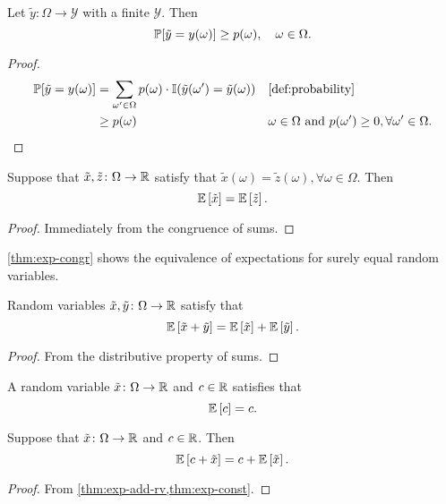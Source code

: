 \begin{lemma} \label{lem:prob-ge-measure}
  Let $\tilde{y}\colon \Omega \to \mathcal{Y}$ with a finite $\mathcal{Y}$. Then
  \[
   \mathbb{P}[\tilde{y} = y(\omega)] \ge p(\omega ), \quad \omega \in \Omega . 
  \]
\end{lemma}
\begin{proof}
 \begin{align*}
   \PP[\tilde{y} = y(\omega)]
   &= \sum_{\omega' \in \Omega } p(\omega) \cdot \I(\tilde{y}(\omega') = \tilde{y}(\omega)) && \text{\cref{def:probability}} \\
   &\ge p(\omega ) && \omega \in \Omega \text{ and } p(\omega') \ge 0, \forall \omega '\in \Omega. 
 \end{align*}
\end{proof}

\begin{theorem} \label{thm:exp-congr}
  Suppose that $\tilde{x}, \tilde{z} \colon \Omega \to \mathbb{R}$ satisfy that $\tilde{x}(\omega) = \tilde{z}(\omega), \forall \omega \in \Omega$. Then
  \[
   \mathbb{E} \left[ \tilde{x} \right] = \mathbb{E} \left[ \tilde{z} \right].
  \]
\end{theorem}
\begin{proof}
Immediately from the congruence of sums.
\end{proof}

\begin{remark}
\cref{thm:exp-congr} shows the equivalence of expectations for surely equal random variables. 
\end{remark}

\begin{theorem} \label{thm:exp-add-rv}
  Random variables $\tilde{x}, \tilde{y} \colon \Omega \to \mathbb{R}$ satisfy that
  \[
    \mathbb{E} \left[ \tilde{x} + \tilde{y} \right]
    =
    \mathbb{E} \left[ \tilde{x} \right] + \mathbb{E} \left[ \tilde{y} \right].
  \]
\end{theorem}
\begin{proof}
  From the distributive property of sums. 
\end{proof}

\begin{theorem} \label{thm:exp-const}
  A random variable $\tilde{x}\colon \Omega \to \mathbb{R}$ and $c\in \mathbb{R} $ satisfies that
  \[
   \mathbb{E} \left[ c \right] = c.
  \]
\end{theorem}


\begin{theorem} \label{thm:exp-add-cons}
Suppose that $\tilde{x} \colon \Omega \to \mathbb{R}$ and $c\in \mathbb{R}$. Then
\[
\mathbb{E} \left[ c + \tilde{x} \right] = c + \mathbb{E} \left[ \tilde{x} \right].
\]
\end{theorem}
\begin{proof}
  From \cref{thm:exp-add-rv,thm:exp-const}.
\end{proof}


